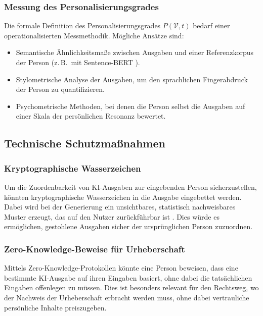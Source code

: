 ﻿\documentclass[a4paper,12pt]{article}
\theoremstyle{definition}
\begin{document}
\subsubsection{Messung des Personalisierungsgrades}

Die formale Definition des Personalisierungsgrades $P(\mathcal{V}, t)$ bedarf einer
operationalisierten Messmethodik. Mögliche Ansätze sind:
\begin{itemize}
    \item Semantische Ähnlichkeitsmaße zwischen Ausgaben und einer Referenzkorpus der Person
          (z.\,B.\ mit Sentence-BERT \cite{reimers2019sentencebert}).
    \item Stylometrische Analyse der Ausgaben, um den sprachlichen Fingerabdruck der Person
          zu quantifizieren.
    \item Psychometrische Methoden, bei denen die Person selbst die Ausgaben auf einer
          Skala der persönlichen Resonanz bewertet.
\end{itemize}

\subsection{Technische Schutzmaßnahmen}

\subsubsection{Kryptographische Wasserzeichen}

Um die Zuordenbarkeit von KI-Ausgaben zur eingebenden Person sicherzustellen, könnten
kryptographische Wasserzeichen in die Ausgabe eingebettet werden. Dabei wird bei der
Generierung ein unsichtbares, statistisch nachweisbares Muster erzeugt, das auf den
Nutzer zurückführbar ist \cite{kirchenbauer2023watermark}. Dies würde es ermöglichen,
gestohlene Ausgaben sicher der ursprünglichen Person zuzuordnen.

\subsubsection{Zero-Knowledge-Beweise für Urheberschaft}

Mittels Zero-Knowledge-Protokollen \cite{goldwasser1989knowledge} könnte eine Person
beweisen, dass eine bestimmte KI-Ausgabe auf ihren Eingaben basiert, ohne dabei die
tatsächlichen Eingaben offenlegen zu müssen. Dies ist besonders relevant für den
Rechtsweg, wo der Nachweis der Urheberschaft erbracht werden muss, ohne dabei
vertrauliche persönliche Inhalte preiszugeben.
\end{document}
